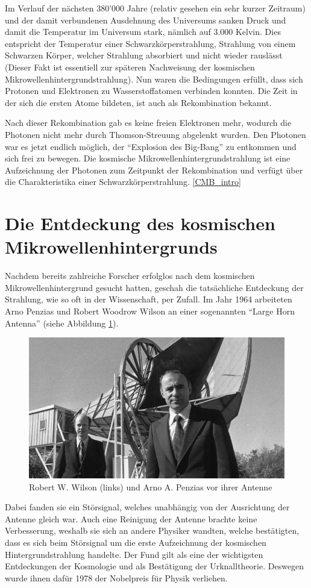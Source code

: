 Im Verlauf der nächsten 380'000 Jahre (relativ gesehen ein sehr kurzer Zeitraum) und der damit verbundenen Ausdehnung des 
Universums sanken Druck und damit die Temperatur im Universum stark, nämlich auf 3.000 
Kelvin.
Dies entspricht der Temperatur einer Schwarzkörperstrahlung, Strahlung von 
einem Schwarzen Körper, welcher Strahlung absorbiert und nicht wieder rauslässt 
(Dieser Fakt ist essentiell zur späteren Nachweisung der kosmischen 
Mikrowellenhintergrundstrahlung).
Nun waren die Bedingungen erfüllt, dass sich Protonen und Elektronen zu 
Wasserstoffatomen verbinden konnten.
Die Zeit in der sich die ersten Atome bildeten, ist auch als Rekombination bekannt.


Nach dieser Rekombination gab es keine freien Elektronen mehr, wodurch die 
Photonen nicht mehr durch Thomson-Streuung abgelenkt wurden.
Den Photonen war es jetzt endlich möglich, der ``Explosion des Big-Bang'' zu 
entkommen und sich frei zu bewegen.
Die kosmische Mikrowellenhintergrundstrahlung ist eine Aufzeichnung der Photonen zum 
Zeitpunkt der Rekombination und verfügt über die Charakteristika einer Schwarzkörperstrahlung.
\ref{CMB_intro}

\section{Die Entdeckung des kosmischen Mikrowellenhintergrunds}
Nachdem bereits zahlreiche Forscher erfolglos nach dem kosmischen 
Mikrowellenhintergrund gesucht hatten, geschah die tatsächliche Entdeckung der 
Strahlung, wie so oft in der Wissenschaft, per Zufall.
Im Jahr 1964 arbeiteten Arno Penzias und Robert Woodrow Wilson an einer 
sogenannten ``Large Horn Antenna'' (siehe Abbildung \ref{fig:wilson_penzias}).
\begin{figure}
	\includegraphics[width=\linewidth]{cmb/images/penzias-wilson-large-horn-antenna.jpg}
	\caption{Robert W. Wilson (links) und Arno A. Penzias vor ihrer Antenne}
	\label{fig:wilson_penzias}
\end{figure}
Dabei fanden sie ein Störsignal, welches unabhängig von der Ausrichtung der 
Antenne gleich war.
Auch eine Reinigung der Antenne brachte keine Verbesserung, weshalb sie sich an 
andere Physiker wandten, welche bestätigten, dass es sich beim Störsignal um 
die erste Aufzeichnung der kosmischen Hintergrundstrahlung handelte.
Der Fund gilt als eine der wichtigsten Entdeckungen der Kosmologie und als 
Bestätigung der Urknalltheorie.
Deswegen wurde ihnen dafür 1978 der Nobelpreis für Physik verliehen.

